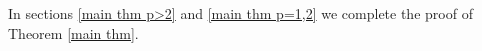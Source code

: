     In sections \ref{main thm p>2} and \ref{main thm p=1,2} we complete the proof of Theorem \ref{main thm}.  

% 
% 
% 
% 
% 
% 
% 
